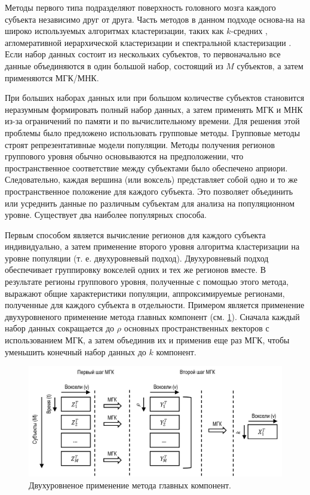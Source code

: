 Методы первого типа подразделяют поверхность головного мозга каждого субъекта независимо друг от друга. Часть методов в данном подходе основа-на на широко используемых алгоритмах кластеризации, таких как $k$-средних \cite{arslan2015multi}, агломеративной иерархической кластеризации \cite{blumensath2013spatially} и спектральной кластеризации \cite{van2008normalized}. Если набор данных состоит из нескольких субъектов, то первоначально все данные объединяются в один большой набор, состоящий из $M$ субъектов, а затем применяются МГК/МНК.

При больших наборах данных или при большом количестве субъектов становится неразумным формировать полный набор данных, а затем применять МГК и МНК из-за ограничений по памяти и по вычислительному времени. Для решения этой проблемы было предложено использовать групповые методы. Групповые методы строят репрезентативные модели популяции. Методы получения регионов группового уровня обычно основываются на предположении, что пространственное соответствие между субъектами было обеспечено априори. Следовательно, каждая вершина (или воксель) представляет собой одно и то же пространственное положение для каждого субъекта. Это позволяет объединить или усреднить данные по различным субъектам для анализа на популяционном уровне. Существует два наиболее популярных способа.

Первым способом является вычисление регионов для каждого субъекта индивидуально, а затем применение второго уровня алгоритма кластеризации на уровне популяции (т. е. двухуровневый подход). Двухуровневый подход обеспечивает группировку вокселей одних и тех же регионов вместе. В результате регионы группового уровня, полученные с помощью этого метода, выражают общие характеристики популяции, аппроксимируемые регионами, полученные для каждого субъекта в отдельности. Примером является применение двухуровненого применение метода главных компонент \cite{calhoun2001method} (см. \cref{fig:two_step_pca}). Сначала каждый набор данных сокращается до $\rho$ основных пространственных векторов с использованием МГК, а затем объединив их и применив еще раз  МГК, чтобы уменьшить конечный набор данных до $k$ компонент.

\begin{figure}[ht]
    \centering
    \includegraphics[width=1.0\linewidth]{images/two_step_pca.pdf}
    \caption{Двухуровненое применение метода главных компонент.}\label{fig:two_step_pca}
\end{figure}

